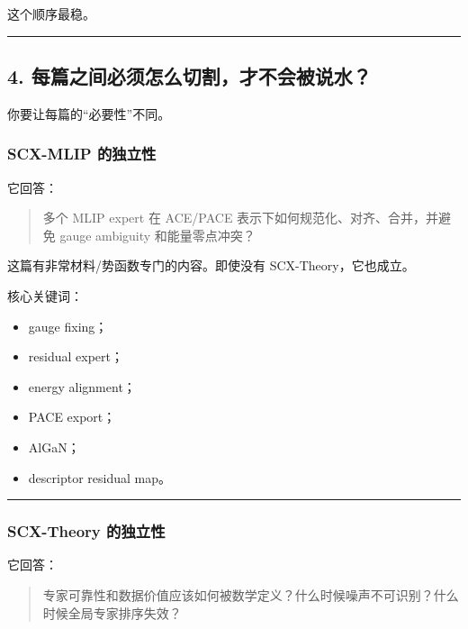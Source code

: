 \documentclass[
  12pt,
]{ctexart}
\providecommand{\tightlist}{%
  \setlength{\itemsep}{0pt}\setlength{\parskip}{0pt}}
\begin{document}
这个顺序最稳。

\begin{center}\rule{0.5\linewidth}{0.5pt}\end{center}

\subsection{4.
每篇之间必须怎么切割，才不会被说水？}\label{ux6bcfux7bc7ux4e4bux95f4ux5fc5ux987bux600eux4e48ux5207ux5272ux624dux4e0dux4f1aux88abux8bf4ux6c34}

你要让每篇的``必要性''不同。

\subsubsection{SCX-MLIP
的独立性}\label{scx-mlip-ux7684ux72ecux7acbux6027}

它回答：

\begin{quote}
多个 MLIP expert 在 ACE/PACE 表示下如何规范化、对齐、合并，并避免 gauge
ambiguity 和能量零点冲突？
\end{quote}

这篇有非常材料/势函数专门的内容。即使没有 SCX-Theory，它也成立。

核心关键词：

\begin{itemize}
\tightlist
\item
  gauge fixing；
\item
  residual expert；
\item
  energy alignment；
\item
  PACE export；
\item
  AlGaN；
\item
  descriptor residual map。
\end{itemize}

\begin{center}\rule{0.5\linewidth}{0.5pt}\end{center}

\subsubsection{SCX-Theory
的独立性}\label{scx-theory-ux7684ux72ecux7acbux6027}

它回答：

\begin{quote}
专家可靠性和数据价值应该如何被数学定义？什么时候噪声不可识别？什么时候全局专家排序失效？
\end{quote}
\end{document}
